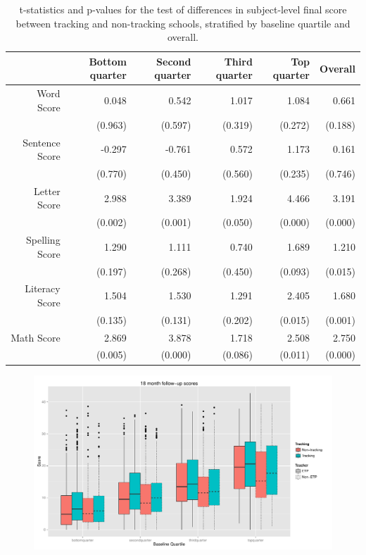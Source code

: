 \documentclass[11pt]{article}
\begin{document}
\begin{table}[ht]
\centering
\begin{tabular}{rrrrrr}
  \hline
 & Bottom quarter & Second quarter & Third quarter & Top quarter & Overall \\ 
  \hline
Word Score & 0.048 & 0.542 & 1.017 & 1.084 & 0.661 \\ 
   & (0.963) & (0.597) & (0.319) & (0.272) & (0.188) \\ 
  Sentence Score & -0.297 & -0.761 & 0.572 & 1.173 & 0.161 \\ 
   & (0.770) & (0.450) & (0.560) & (0.235) & (0.746) \\ 
  Letter Score & 2.988 & 3.389 & 1.924 & 4.466 & 3.191 \\ 
   & (0.002) & (0.001) & (0.050) & (0.000) & (0.000) \\ 
  Spelling Score & 1.290 & 1.111 & 0.740 & 1.689 & 1.210 \\ 
   & (0.197) & (0.268) & (0.450) & (0.093) & (0.015) \\ 
  Literacy Score & 1.504 & 1.530 & 1.291 & 2.405 & 1.680 \\ 
   & (0.135) & (0.131) & (0.202) & (0.015) & (0.001) \\ 
  Math Score & 2.869 & 3.878 & 1.718 & 2.508 & 2.750 \\ 
   & (0.005) & (0.000) & (0.086) & (0.011) & (0.000) \\ 
   \hline
\end{tabular}
\caption{t-statistics and p-values for the test of differences in subject-level final score between tracking and non-tracking schools, stratified by baseline quartile and overall.} 
\end{table} %

 
 \begin{figure}[H]
 \centering
 \includegraphics[scale=0.5]{tracking-etp-stratif.pdf}
 \caption{}
 \label{fig:tracking-etp}
 \end{figure}
 
\end{document}
